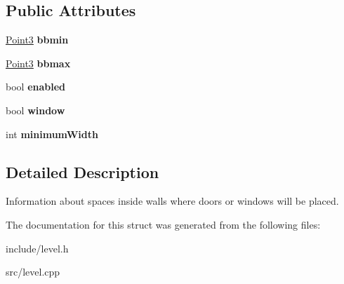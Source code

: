 \subsection*{\-Public \-Attributes}
\begin{DoxyCompactItemize}
\item 
\hypertarget{structLevel_1_1DoorOrWindowSpace_aa51dc1fd9fd0c9c5260f2e55c6867511}{
\hyperlink{classPoint3}{\-Point3} {\bfseries bbmin}}
\label{db/d7a/structLevel_1_1DoorOrWindowSpace_aa51dc1fd9fd0c9c5260f2e55c6867511}

\item 
\hypertarget{structLevel_1_1DoorOrWindowSpace_a081ced79724f4d1cad9a40b4187ad858}{
\hyperlink{classPoint3}{\-Point3} {\bfseries bbmax}}
\label{db/d7a/structLevel_1_1DoorOrWindowSpace_a081ced79724f4d1cad9a40b4187ad858}

\item 
\hypertarget{structLevel_1_1DoorOrWindowSpace_a5b015965fbc6e5160e3727a85decef1a}{
bool {\bfseries enabled}}
\label{db/d7a/structLevel_1_1DoorOrWindowSpace_a5b015965fbc6e5160e3727a85decef1a}

\item 
\hypertarget{structLevel_1_1DoorOrWindowSpace_a99d4bbfac73c54dc641834cc809d4f8a}{
bool {\bfseries window}}
\label{db/d7a/structLevel_1_1DoorOrWindowSpace_a99d4bbfac73c54dc641834cc809d4f8a}

\item 
\hypertarget{structLevel_1_1DoorOrWindowSpace_a94fe6fbd1b3ab285a06ea3a967197563}{
int {\bfseries minimum\-Width}}
\label{db/d7a/structLevel_1_1DoorOrWindowSpace_a94fe6fbd1b3ab285a06ea3a967197563}

\end{DoxyCompactItemize}


\subsection{\-Detailed \-Description}
\-Information about spaces inside walls where doors or windows will be placed. 

\-The documentation for this struct was generated from the following files\-:\begin{DoxyCompactItemize}
\item 
include/level.\-h\item 
src/level.\-cpp\end{DoxyCompactItemize}
